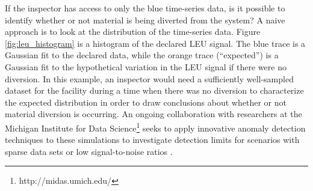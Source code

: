 If the inspector has access to only the blue time-series data, is it possible to identify whether or not material is being diverted from the system?  A naive approach is to look at the distribution of the time-series data.  Figure \ref{fig:leu_histogram} is a histogram of the declared \gls{LEU} signal.  The blue trace is a Gaussian fit to the declared data, while the orange trace (``expected'') is a Gaussian fit to the hypothetical variation in the \gls{LEU} signal if there were no diversion.  In this example, an inspector would need a sufficiently well-sampled dataset for the facility during a time when there was no diversion to characterize the expected distribution in order to draw conclusions about whether or not material diversion is occurring. An ongoing collaboration with researchers at the Michigan Institute for Data Science\footnote{http://midas.umich.edu/} seeks to apply innovative anomaly detection techniques to these simulations to investigate detection limits for scenarios with sparse data sets or low signal-to-noise ratios .





  
